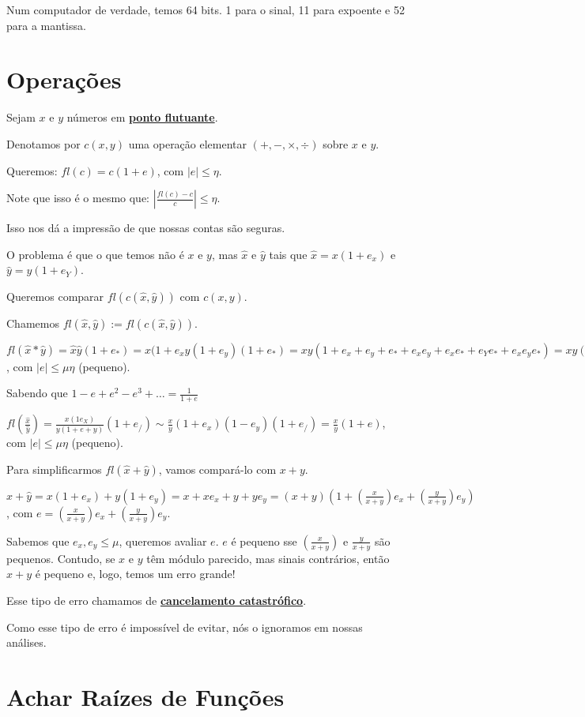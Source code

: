 \documentclass[12pt]{book}
\newcommand{\mytitle}[1]{\textbf{\underline{#1}}}
\begin{document}
Num computador de verdade, temos 64 bits. 1 para o sinal, 11 para expoente e 52 para a mantissa.

\section{Operações}

Sejam $x$ e $y$ números em \mytitle{ponto flutuante}.

Denotamos por $c(x,y)$ uma operação elementar $(+,-,\times,\div)$ sobre $x$ e $y$.

Queremos: $fl(c)=c(1+e)$, com $|e|\leq \eta$.

Note que isso é o mesmo que: $|\frac{fl(c)-c}{c}|\leq \eta$.

Isso nos dá a impressão de que nossas contas são seguras.

O problema é que o que temos não é $x$ e $y$, mas $\hat{x}$ e $\hat{y}$ tais que $\hat{x}=x(1+e_x)$ e $\hat{y}=y(1+e_Y)$.

Queremos comparar $fl(c(\hat{x},\hat{y}))$ com $c(x,y)$.

Chamemos $fl(\hat{x},\hat{y}) := fl(c(\hat{x},\hat{y}))$.

$fl(\hat{x}*\hat{y})=\hat{x}\hat{y}(1+e_*)=x(1+e_xy(1+e_y)(1+e_*)=xy(1+e_x+e_y+e_*+e_xe_y+e_xe_*+e_Ye_*+e_xe_ye_*)=xy(1+e)$, com $|e|\leq \mu \eta$ (pequeno).

Sabendo que $1-e+e^2-e^3+\dots=\frac{1}{1+e}$

$fl(\frac{\hat{x}}{\hat{y}})=\frac{x(1{e_X})}{y(1+e+y)}(1+e_/)\sim \frac{x}{y}(1+e_x)(1-e_y)(1+e_/)=\frac{x}{y}(1+e)$, com $|e|\leq \mu \eta$ (pequeno).

Para simplificarmos $fl(\hat{x}+\hat{y})$, vamos compará-lo com $x+y$.

$\hat{x}+\hat{y}=x(1+e_x)+y(1+e_y)=x+xe_x+y+ye_y=(x+y)(1+(\frac{x}{x+y})e_x+(\frac{y}{x+y})e_y)$, com $e=(\frac{x}{x+y})e_x+(\frac{y}{x+y})e_y$.

\newpage

Sabemos que $e_x,e_y\leq \mu$, queremos avaliar $e$. $e$ é pequeno sse $(\frac{x}{x+y})$ e $\frac{y}{x+y}$ são pequenos. Contudo, se $x$ e $y$ têm módulo parecido, mas sinais contrários, então $x+y$ é pequeno e, logo, temos um erro grande!

Esse tipo de erro chamamos de \mytitle{cancelamento catastrófico}.

Como esse tipo de erro é impossível de evitar, nós o ignoramos em nossas análises.

\section{Achar Raízes de Funções}
\end{document}
